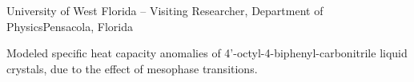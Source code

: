 \begin{rSubsection}{University of West Florida}{ -- }{Visiting Researcher, Department of Physics}{Pensacola, Florida}
\item Modeled specific heat capacity anomalies of 4'-octyl-4-biphenyl-carbonitrile liquid crystals, due to the effect of mesophase transitions.
  \else \fi
\end{rSubsection}
